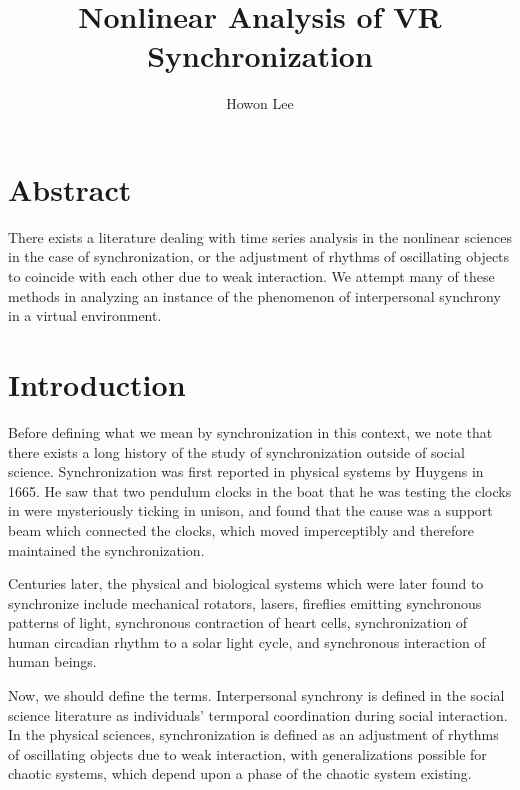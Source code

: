 \documentclass[12pt]{article}
\begin{document}
\title{Nonlinear Analysis of VR Synchronization}
\author{Howon Lee}
\maketitle

\section{Abstract}
There exists a literature dealing with time series analysis in the nonlinear sciences in the case of synchronization, or the adjustment of rhythms of oscillating objects to coincide with each other due to weak interaction. We attempt many of these methods in analyzing an instance of the phenomenon of interpersonal synchrony in a virtual environment.%



\section{Introduction}


Before defining what we mean by synchronization in this context, we note that there exists a long history of the study of synchronization outside of social science. Synchronization was first reported in physical systems by Huygens in 1665. He saw that two pendulum clocks in the boat that he was testing the clocks in were mysteriously ticking in unison, and found that the cause was a support beam which connected the clocks, which moved imperceptibly and therefore maintained the synchronization. %

Centuries later, the physical and biological systems which were later found to synchronize include mechanical rotators, lasers, fireflies emitting synchronous patterns of light, synchronous contraction of heart cells, synchronization of human circadian rhythm to a solar light cycle, and synchronous interaction of human beings. %

Now, we should define the terms. Interpersonal synchrony is defined in the social science literature as individuals' termporal coordination during social interaction. In the physical sciences, synchronization is defined as an adjustment of rhythms of oscillating objects due to weak interaction, with generalizations possible for chaotic systems, which depend upon a phase of the chaotic system existing. %
\end{document}
